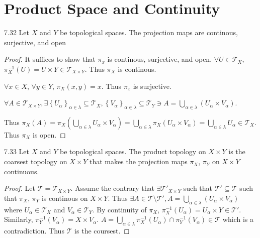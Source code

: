 \documentclass{article}
\newcommand*{\T}{\mathcal{T}}
\newcommand*{\subeq}{\subseteq}
\begin{document}
\pagebreak

\section*{Product Space and Continuity}

\begin{claim}{7.32}\label{Claim 7.32.}
    Let $X$ and $Y$ be topological spaces. The projection maps are continous, surjective, and open  
\end{claim}
\begin{proof}
    It suffices to show that $\pi_x$ is continous, surjective, and open. $\forall U \in \T_X$, $\pi_X^{-1}(U) = U \times Y \in \T_{X \times Y}$. Thus $\pi_X$ is continous. 
    
    $\forall x \in X$, $\forall y \in Y$, $\pi_{X}(x, y) = x$. Thus $\pi_x$ is surjective. 
    
    $\forall A \in \T_{X \times Y}, \exists \left\{ U_\alpha \right\}_{\alpha \in \lambda} \subeq \T_X, \left\{ V_{\alpha} \right\}_{\alpha \in \lambda} \subeq \T_Y \ni A = \bigcup_{\alpha \in \lambda}(U_\alpha \times V_\alpha)$. 
    
    Thus $\pi_X(A) = \pi_X\left(\bigcup_{\alpha \in \lambda} U_\alpha \times V_\alpha\right) = \bigcup_{\alpha \in \lambda} \pi_X(U_\alpha \times V_\alpha) = \bigcup_{\alpha \in \lambda} U_\alpha \in \T_X$. Thus $\pi_X$ is open.     
\end{proof}

\bigskip

\begin{claim}{7.33}\label{Claim 7.33.}
    Let $X$ and $Y$ be topological spaces. The product topology on $X \times Y$ is the coarsest topology on $X \times Y$  that makes the projection maps $\pi_X$, $\pi_Y$ on $X \times Y$  continuous.
\end{claim}
\begin{proof}
    Let $\T = \T_{X \times Y}$.  
    Assume the contrary that $\exists \T'_{X \times Y}$ such that $\T' \subeq \T$ such that $\pi_X$, $\pi_Y$ is continous on $X \times Y$. Thus $\exists A \in \T \setminus \T', A = \bigcup_{\alpha \in \lambda}(U_\alpha \times V_\alpha)$ where $U_\alpha \in \T_X$ and $V_\alpha \in \T_Y$. By continuity of $\pi_X$, $\pi_X^{-1}(U_\alpha) = U_\alpha \times Y \in \T'$. Similarly, $\pi_Y^{-1}(V_\alpha) = X \times V_\alpha$. $A = \bigcup_{\alpha \in \lambda} \pi_X^{-1}(U_\alpha) \cap \pi_Y^{-1}(V_\alpha) \in \T$ which is a contradiction. Thus $\T$ is the coursest.  
\end{proof}
\end{document}

